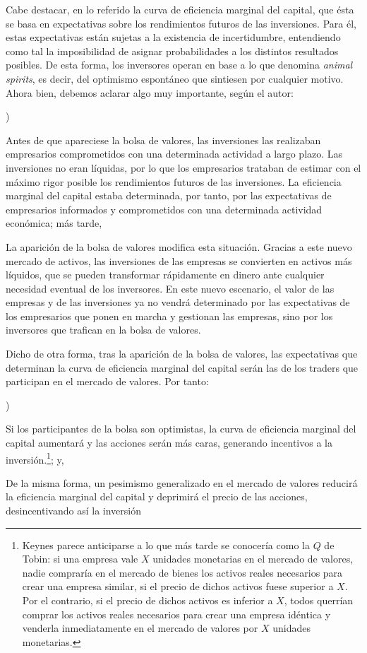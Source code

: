 \documentclass[10pt,a4paper]{article}
\newcounter{alphaitem}
\newenvironment{la}
      {\begin{list}{\alph{alphaitem})}{%
          \usecounter{alphaitem}%
          \setlength{\leftmargin}{1cm}%
          \setlength{\parskip}{3pt}%
          \setlength{\itemsep}{0pt}%
          \setlength{\parsep}{0pt}%
      }}
      {\end{list}}
\begin{document}
Cabe destacar, en lo referido la curva de eficiencia marginal del capital, que ésta se basa en expectativas sobre los rendimientos futuros de las inversiones. Para él, estas expectativas están sujetas a la existencia de incertidumbre, entendiendo como tal la imposibilidad de asignar probabilidades a los distintos resultados posibles. De esta forma, los inversores operan en base a lo que denomina \textit{animal spirits}, es decir, del optimismo espontáneo que sintiesen por cualquier motivo. Ahora bien, debemos aclarar algo muy importante, según el autor:
\begin{la}
    \item Antes de que apareciese la bolsa de valores, las inversiones las realizaban empresarios comprometidos con una determinada actividad a largo plazo. Las inversiones no eran líquidas, por lo que los empresarios trataban de estimar con el máximo rigor posible los rendimientos futuros de las inversiones. La eficiencia marginal del capital estaba determinada, por tanto, por las expectativas de empresarios informados y comprometidos con una determinada actividad económica; más tarde,
    \item La aparición de la bolsa de valores modifica esta situación. Gracias a este nuevo mercado de activos, las inversiones de las empresas se convierten en activos más líquidos, que se pueden transformar rápidamente en dinero ante cualquier necesidad eventual de los inversores. En este nuevo escenario, el valor de las empresas y de las inversiones ya no vendrá determinado por las expectativas de los empresarios que ponen en marcha y gestionan las empresas, sino por los inversores que trafican en la bolsa de valores.  
\end{la}

Dicho de otra forma, tras la aparición de la bolsa de valores, las expectativas que determinan la curva de eficiencia marginal del capital serán las de los traders que participan en el mercado de valores. Por tanto:
\begin{la}
    \item Si los participantes de la bolsa son optimistas, la curva de eficiencia marginal del capital aumentará y las acciones serán más caras, generando incentivos a la inversión.\footnote{%
        Keynes parece anticiparse a lo que más tarde se conocería como la $Q$ de Tobin: si una empresa vale $X$ unidades monetarias en el mercado de valores, nadie compraría en el mercado de bienes los activos reales necesarios para crear una empresa similar, si el precio de dichos activos fuese superior a $X$. Por el contrario, si el precio de dichos activos es inferior a $X$, todos querrían comprar los activos reales necesarios para crear una empresa idéntica y venderla inmediatamente en el mercado de valores por $X$ unidades monetarias.
    }; y,
    \item De la misma forma, un pesimismo generalizado en el mercado de valores reducirá la eficiencia marginal del capital y deprimirá el precio de las acciones, desincentivando así la inversión
\end{la}
\end{document}
